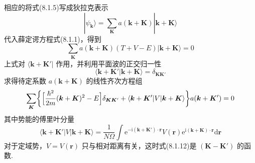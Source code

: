 相应的将式(8.1.5)写成狄拉克表示
\begin{equation}
  |\psi_{\boldsymbol{k}}\rangle=\sum_{\boldsymbol{K}}a(\boldsymbol{k}+\boldsymbol{K})|\boldsymbol{k}+\boldsymbol{K}\rangle
\end{equation}
代入薛定谔方程式(8.1.1)，得到
\begin{equation}
  \sum_{\boldsymbol{K}}a(\boldsymbol{k}+\boldsymbol{K})(T+V-E)|\boldsymbol{k}+\boldsymbol{K}\rangle=0
\end{equation}
上式对 $\langle\boldsymbol{k}+\boldsymbol{K}'|$ 作用，并利用平面波的正交归一性
\begin{equation}
  \langle\boldsymbol{k}+\boldsymbol{K}'|\boldsymbol{k}+\boldsymbol{K}\rangle=\delta_{\boldsymbol{K}\boldsymbol{K}'}
\end{equation}
求得待定系数 $a(\boldsymbol{k}+\boldsymbol{K})$ 的线性齐次方程组
\begin{equation}
  \sum_{\boldsymbol{K}}\biggl\{\Bigl[\frac{\hbar^{2}}{2m}(\boldsymbol{k}+\boldsymbol{K})^{2}-E\Bigr]\delta_{\boldsymbol{K}\boldsymbol{K}'}
  +\langle\boldsymbol{k}+\boldsymbol{K}'|V|\boldsymbol{k}+\boldsymbol{K}\rangle\biggr\}a(\boldsymbol{k}+\boldsymbol{K}')=0
\end{equation}
其中势能的傅里叶分量
\begin{equation}
  \langle\boldsymbol{k}+\boldsymbol{K}'|V|\boldsymbol{k}+\boldsymbol{K}\rangle
  =\frac{1}{N\Omega}\int\mathrm{e}^{-\mathrm{i}(\boldsymbol{k}+\boldsymbol{K}')\cdot\boldsymbol{r}}V(\boldsymbol{r})\mathrm{e}^{\mathrm{i}(\boldsymbol{k}+\boldsymbol{K})\cdot\boldsymbol{r}}\mathrm{d}\boldsymbol{r}
\end{equation}
对于定域势，$V=V(\boldsymbol{r})$ 只与相对距离有关，这时式(8.1.12)是 $(\boldsymbol{K}-\boldsymbol{K}')$ 的函数.

